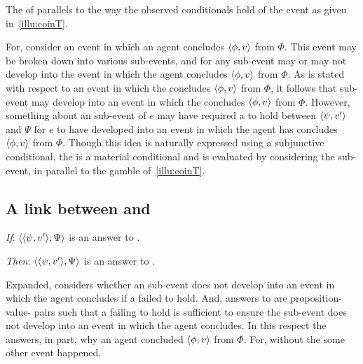 \begin{note}
  The \itc{} of \qWhyV{} parallels to the way the observed conditionals hold of the event as given in~\autoref{illu:coinT}.

  For, consider an event in which an agent concludes \(\langle \phi, v \rangle\) from \(\Phi\).
  This event may be broken down into various sub-events, and for any sub-event may or may not develop into the event in which the agent concludes \(\langle \phi, v \rangle\) from \(\Phi\).
  As \qWhyV{} is stated with respect to an event in which the concludes \(\langle \phi, v \rangle\) from \(\Phi\), it follows that sub-event may develop into an event in which the concludes \(\langle \phi, v \rangle\) from \(\Phi\).
  However, something about an sub-event of \(e\) may have required a \ros{} to hold between \(\langle \psi, v' \rangle\) and \(\Psi\) for \(e\) to have developed into an event in which the agent has concludes \(\langle \phi, v \rangle\) from \(\Phi\).
  Though this idea is naturally expressed using a subjunctive conditional, the \itc{} is a material conditional and is evaluated by considering the sub-event, in parallel to the gamble of~\autoref{illu:coinT}.
\end{note}


\subsection{A link between \qWhyV{} and \qWhy{}}
\label{cha:var:qwhyvnp:link}

\begin{note}
  \begin{link}%
    \label{link:why:support:pvpp}%
    \vspace{-\baselineskip}
    \begin{itenum}
    \item[\emph{If}:]
      \(\langle \langle \psi, v' \rangle, \Psi \rangle\) is an answer to \qWhyV{}.
    \item[\emph{Then}:]
      \(\langle \langle \psi, v' \rangle, \Psi \rangle\) is an answer to \qWhy{}.
    \end{itenum}
    \vspace{-\baselineskip}
  \end{link}

  \noindent%
  Expanded, \qWhyV{} considers whether an sub-event does not develop into an event in which the agent concludes if a \ros{} failed to hold.
  And, answers to \qWhyV{} are proposition-value-\pool{} pairs such that a \ros{} failing to hold is sufficient to ensure the sub-event does not develop into an event in which the agent concludes.
  In this respect the \ros{} answers, in part, why an agent concluded \(\langle \phi, v \rangle\) from \(\Phi\).
  For, without the \ros{} some other event happened.
\end{note}

